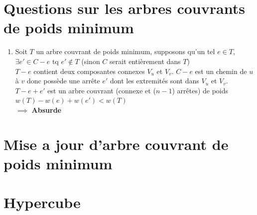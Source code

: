 \documentclass{article}
\begin{document}
\section{Questions sur les arbres couvrants de poids minimum}

\begin{enumerate}
    \item Soit $T$ un arbre couvrant de poids minimum, supposons qu'un tel $e \in T$, \\
    $\exists e' \in C - e$ tq $e' \notin T$ (sinon $C$ serait entièrement dans $T$) \\
    $T - e$ contient deux composantes connexes $V_u$ et $V_v$.
    $C - e$ est un chemin de $u$ à $v$ donc possède une arrête $e'$ dont les extremités sont dans $V_u$ et $V_v$. \\
    $T - e + e'$ est un arbre couvrant (connexe et ($n-1$) arrêtes) de poids $w(T) - w(e) + w(e') < w(T)$ \\
    $\implies$ \textbf{Absurde}
\end{enumerate}

\section{Mise a jour d'arbre couvrant de poids minimum}

\section{Hypercube}
\begin{enumerate}
    \item 
    \begin{minipage}[t]{\linewidth}
        {
        \centering
    \item $2^n$ sommets, $deg(v) = n$
    \[ \sum_{v \in V} deg(v) = 2 |E| \implies |E| = n2^{n-1} \]
\end{enumerate}
\end{document}
